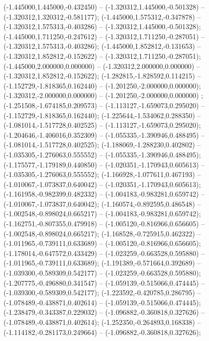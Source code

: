  (-1.445000,1.445000,-0.432450) -- (-1.320312,1.445000,-0.501328) -- (-1.320312,1.320312,-0.581177);
 (-1.445000,1.575312,-0.347878) -- (-1.320312,1.575313,-0.403286) -- (-1.320312,1.445000,-0.501328);
 (-1.445000,1.711250,-0.247612) -- (-1.320312,1.711250,-0.287051) -- (-1.320312,1.575313,-0.403286);
 (-1.445000,1.852812,-0.131653) -- (-1.320312,1.852812,-0.152622) -- (-1.320312,1.711250,-0.287051);
 (-1.445000,2.000000,0.000000) -- (-1.320312,2.000000,0.000000) -- (-1.320312,1.852812,-0.152622);
 (-1.282815,-1.828592,0.114215) -- (-1.152729,-1.818365,0.162440) -- (-1.201250,-2.000000,0.000000);
 (-1.320312,-2.000000,0.000000) -- (-1.201250,-2.000000,0.000000) ;
 (-1.251508,-1.674185,0.209573) -- (-1.113127,-1.659073,0.295020) -- (-1.152729,-1.818365,0.162440);
 (-1.225644,-1.534062,0.288350) -- (-1.081014,-1.517728,0.402525) -- (-1.113127,-1.659073,0.295020);
 (-1.204646,-1.406016,0.352309) -- (-1.055335,-1.390946,0.488495) -- (-1.081014,-1.517728,0.402525);
 (-1.188069,-1.288230,0.402802) -- (-1.035305,-1.276063,0.555552) -- (-1.055335,-1.390946,0.488495);
 (-1.175577,-1.179189,0.440850) -- (-1.020351,-1.170943,0.605613) -- (-1.035305,-1.276063,0.555552);
 (-1.166928,-1.077611,0.467193) -- (-1.010067,-1.073837,0.640042) -- (-1.020351,-1.170943,0.605613);
 (-1.161958,-0.982399,0.482332) -- (-1.004183,-0.983281,0.659742) -- (-1.010067,-1.073837,0.640042);
 (-1.160574,-0.892595,0.486548) -- (-1.002548,-0.898024,0.665217) -- (-1.004183,-0.983281,0.659742);
 (-1.162751,-0.807355,0.479918) -- (-1.005120,-0.816966,0.656605) -- (-1.002548,-0.898024,0.665217);
 (-1.168528,-0.725915,0.462322) -- (-1.011965,-0.739111,0.633689) -- (-1.005120,-0.816966,0.656605);
 (-1.178014,-0.647572,0.433429) -- (-1.023259,-0.663528,0.595880) -- (-1.011965,-0.739111,0.633689);
 (-1.191389,-0.571664,0.392689) -- (-1.039300,-0.589309,0.542177) -- (-1.023259,-0.663528,0.595880);
 (-1.207775,-0.496880,0.341547) -- (-1.059139,-0.515066,0.474445) -- (-1.039300,-0.589309,0.542177);
 (-1.223592,-0.420785,0.286795) -- (-1.078489,-0.438871,0.402614) -- (-1.059139,-0.515066,0.474445);
 (-1.238479,-0.343387,0.229032) -- (-1.096882,-0.360818,0.327626) -- (-1.078489,-0.438871,0.402614);
 (-1.252350,-0.264893,0.168338) -- (-1.114182,-0.281173,0.249664) -- (-1.096882,-0.360818,0.327626);
